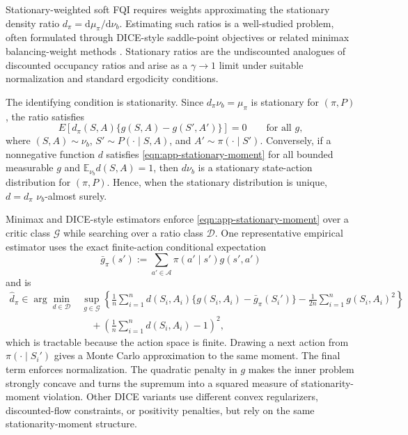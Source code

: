 \documentclass{article}
\theoremstyle{plain}
\theoremstyle{definition}
\theoremstyle{remark}
\newcommand{\E}{\mathbb{E}}
\begin{document}
Stationary-weighted soft FQI requires weights approximating the stationary
density ratio \(d_\pi=\mathrm d\mu_\pi/\mathrm d\nu_b\). Estimating such ratios is
a well-studied problem, often formulated through DICE-style saddle-point
objectives \citep{nachum2019dualdice,zhang2020gendice,lee2021optidice} or
related minimax balancing-weight methods
\citep{uehara2020minimax,wang2023projected}. Stationary ratios are the
undiscounted analogues of discounted occupancy ratios and arise as a
\(\gamma\to1\) limit under suitable normalization and standard ergodicity
conditions.

The identifying condition is stationarity. Since \(d_\pi\nu_b=\mu_\pi\) is
stationary for \((\pi,P)\), the ratio satisfies
\begin{equation}
\label{eqn:app-stationary-moment}
E\!\left[
d_\pi(S,A)\{g(S,A)-g(S',A')\}
\right]=0
\qquad \text{for all } g,
\end{equation}
where \((S,A)\sim\nu_b\), \(S'\sim P(\cdot\mid S,A)\), and
\(A'\sim\pi(\cdot\mid S')\). Conversely, if a nonnegative function \(d\)
satisfies \eqref{eqn:app-stationary-moment} for all bounded measurable \(g\)
and \(\E_{\nu_b}d(S,A)=1\), then \(d\nu_b\) is a stationary state-action
distribution for \((\pi,P)\). Hence, when the stationary distribution is unique,
\(d=d_\pi\) \(\nu_b\)-almost surely.

Minimax and DICE-style estimators enforce
\eqref{eqn:app-stationary-moment} over a critic class \(\mathcal G\) while
searching over a ratio class \(\mathcal D\). One representative empirical
estimator uses the exact finite-action conditional expectation
\[
\bar g_\pi(s')
:=
\sum_{a'\in\mathcal A}\pi(a'\mid s')g(s',a')
\]
and is
\begin{equation}
\label{eqn:app-ratio-objective}
\begin{aligned}
\widehat d_\pi
\in
\arg\min_{d\in\mathcal D}
&\sup_{g\in\mathcal G}
\left\{
\frac{1}{n}\sum_{i=1}^n
d(S_i,A_i)\{g(S_i,A_i)-\bar g_\pi(S_i')\}
-
\frac{1}{2n}\sum_{i=1}^n g(S_i,A_i)^2
\right\}
\\
&\quad+
\left(
\frac{1}{n}\sum_{i=1}^n d(S_i,A_i)-1
\right)^2,
\end{aligned}
\end{equation}
which is tractable because the action space is finite. Drawing a next action
from \(\pi(\cdot\mid S_i')\) gives a Monte Carlo approximation to the same
moment. The final term enforces normalization. The quadratic penalty in \(g\)
makes the inner problem strongly concave and turns the supremum into a squared
measure of stationarity-moment violation. Other DICE variants use different
convex regularizers, discounted-flow constraints, or positivity penalties, but
rely on the same stationarity-moment structure.
\end{document}
